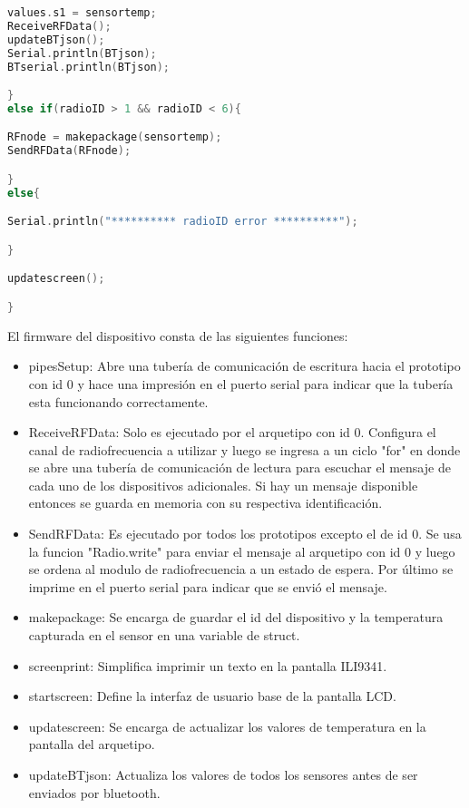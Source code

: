 \begin{lstlisting}[language=C++, caption={Firmware de nuestro prototipo en su versión 1.0}, captionpos=b, basicstyle=\small]
values.s1 = sensortemp;
ReceiveRFData();
updateBTjson();
Serial.println(BTjson);
BTserial.println(BTjson);

}
else if(radioID > 1 && radioID < 6){

RFnode = makepackage(sensortemp);
SendRFData(RFnode);

}
else{

Serial.println("********** radioID error **********");

}

updatescreen();

}


\end{lstlisting}

\par \noindent
El firmware del dispositivo consta de las siguientes funciones:
\begin{itemize}
	\item pipesSetup: Abre una tubería de comunicación de escritura hacia el prototipo con id 0 y hace una impresión en el puerto serial para indicar que la tubería esta funcionando correctamente.
	
	\item ReceiveRFData: Solo es ejecutado por el arquetipo con id 0. Configura el canal de radiofrecuencia a utilizar y luego se ingresa a un ciclo "for" en donde se abre una tubería de comunicación de lectura para escuchar el mensaje de cada uno de los dispositivos adicionales. Si hay un mensaje disponible entonces se guarda en memoria con su respectiva identificación.
	
	\item SendRFData: Es ejecutado por todos los prototipos excepto el de id 0. Se usa la funcion "Radio.write" para enviar el mensaje al arquetipo con id 0 y luego se ordena al modulo de radiofrecuencia a un estado de espera. Por último se imprime en el puerto serial para indicar que se envió el mensaje.
	
	\item makepackage: Se encarga de guardar el id del dispositivo y la temperatura capturada en el sensor en una variable de struct.	
	
	\item screenprint: Simplifica imprimir un texto en la pantalla ILI9341.
	
	\item startscreen: Define la interfaz de usuario base de la pantalla LCD.
	
	\item updatescreen: Se encarga de actualizar los valores de temperatura en la pantalla del arquetipo.
	
	\item updateBTjson: Actualiza los valores de todos los sensores antes de ser enviados por bluetooth.
\end{itemize}

